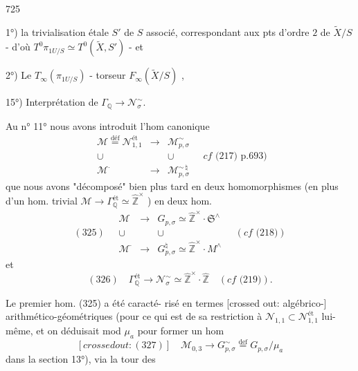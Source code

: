 \newpage


725

1°) la trivialisation étale $S'$ de $S$ associé,
correspondant aux pts d'ordre $2$ de
$\tilde{X}/S$ - d'où $T^0 \pi_{1 U/S} \simeq T^0(\tilde{X}, S')$ - et

2°) Le $T_\infty(\pi_{1 U/S})$ - torseur $F_\infty(\tilde{X}/S)$ ,

\newpage


15°) Interprétation de $\Gamma_{\mathbb{Q}} \to \mathcal{N}_\sigma^\sim$.

Au n° 11° nous avons introduit l'hom
canonique
$$ \begin{matrix} \mathcal{M} \overset{\text{déf}}{=} \mathcal{N}_{1,1}^{\text{ét}} & \longrightarrow & \mathcal{M}_{p,\sigma}^\sim \\ \cup & & \cup \\ \mathcal{M}^\cdot & \longrightarrow & \mathcal{M}_{p,\sigma}^{\sim \, \natural} \end{matrix} \quad cf \text{ (217) p.693)} $$
que nous avons "décomposé" bien plus tard
en deux homomorphismes (en plus d'un
hom. trivial $\mathcal{M} \to \Gamma_{\mathbb{Q}}^{\text{ét}} \simeq \hat{\mathbb{Z}}^\times$ ) en deux
hom.
$$ (325) \quad \begin{matrix} \mathcal{M} & \longrightarrow & G_{p,\sigma} \simeq \hat{\mathbb{Z}}^\times \cdot \mathfrak{S}^\wedge \\ \cup & & \cup \\ \mathcal{M}^\cdot & \longrightarrow & G_{p,\sigma}^\natural \simeq \hat{\mathbb{Z}}^\times \cdot M^\wedge \end{matrix} \quad (cf \text{ (218)}) $$
et
$$ (326) \quad \Gamma_{\mathbb{Q}}^{\text{ét}} \longrightarrow \mathcal{N}_\sigma^\sim \simeq \hat{\mathbb{Z}}^\times \cdot \hat{\mathbb{Z}} \quad (cf \text{ (219)}). $$

Le premier hom. (325) a été caracté-
risé en termes [crossed out: algébrico-] arithmético-géométriques
(pour ce qui est de sa restriction à
$\mathcal{N}_{1,1} \subset \mathcal{N}_{1,1}^{\text{ét}}$ lui-même, et on déduisait
mod $\mu_a$ pour former un hom
$$ [crossed out: (327)] \quad \mathcal{M}_{0,3} \longrightarrow G_{p,\sigma}^\sim \overset{\text{def}}{=} G_{p,\sigma} / \mu_a $$
dans la section 13°), via la tour des

\newpage


